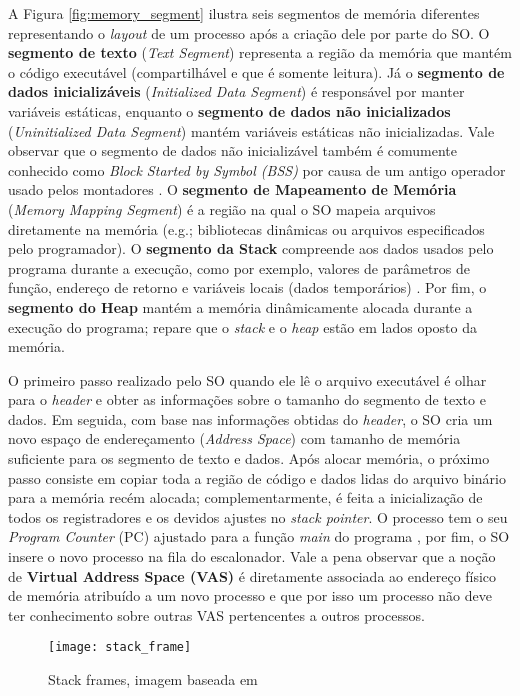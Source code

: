 A Figura \ref{fig:memory_segment} ilustra seis segmentos de memória diferentes
representando o \emph{layout} de um processo após a criação dele por parte do
SO. O \textbf{segmento de texto} (\emph{Text Segment}) representa a região da
memória que mantém o código executável (compartilhável e que é somente
leitura). Já o \textbf{segmento de dados inicializáveis} (\emph{Initialized
Data Segment}) é responsável por manter variáveis estáticas, enquanto o
\textbf{segmento de dados não inicializados} (\emph{Uninitialized Data
Segment}) mantém variáveis estáticas não inicializadas.  Vale observar que o
segmento de dados não inicializável também é comumente conhecido como
\emph{Block Started by Symbol (BSS)} por causa de um antigo operador usado
pelos montadores \cite{gdb}. O \textbf{segmento de Mapeamento de Memória}
(\emph{Memory Mapping Segment}) é a região na qual o SO mapeia arquivos
diretamente na memória (e.g.; bibliotecas dinâmicas ou arquivos especificados
pelo programador). O \textbf{segmento da Stack} compreende aos dados usados
pelo programa durante a execução, como por exemplo, valores de parâmetros de
função, endereço de retorno e variáveis locais (dados temporários)
\cite{silberschatz}.  Por fim, o \textbf{segmento do Heap} mantém a memória
dinâmicamente alocada durante a execução do programa; repare que o \emph{stack}
e o \emph{heap} estão em lados oposto da memória.

O primeiro passo realizado pelo SO quando ele lê o arquivo executável é olhar
para o \emph{header} e obter as informações sobre o tamanho do segmento de
texto e dados. Em seguida, com base nas informações obtidas do \emph{header}, o
SO cria um novo espaço de endereçamento (\emph{Address Space}) com tamanho de
memória suficiente para os segmento de texto e dados. Após alocar memória, o
próximo passo consiste em copiar toda a região de código e dados lidas do
arquivo binário para a memória recém alocada; complementarmente, é feita a
inicialização de todos os registradores e os devidos ajustes no \emph{stack
pointer}. O processo tem o seu \emph{Program Counter} (PC) ajustado para a
função \emph{main} do programa \cite{patterson}, por fim, o SO insere o novo
processo na fila do escalonador. Vale a pena observar que a noção de
\textbf{Virtual Address Space (VAS)} é diretamente associada ao endereço físico
de memória atribuído a um novo processo e que por isso um processo não deve
ter conhecimento sobre outras VAS pertencentes a outros processos.

\begin{figure}[!h]
  \centering
  \texttt{[image: stack\_frame]}
  \caption{Stack frames, imagem baseada em \cite{patterson}}
  \label{fig:stack_frames} 
\end{figure}

